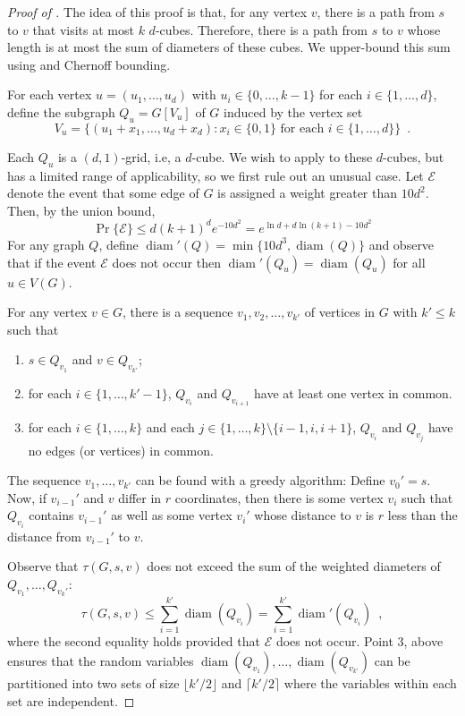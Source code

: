 \documentclass{patmorin}
\DeclareMathOperator{\diam}{diam}
\begin{document}
\begin{proof}[Proof of ]
The idea of this proof is that, for any vertex $v$, there is a path
from $s$ to $v$ that visits at most $k$ $d$-cubes. Therefore, there is
a path from $s$ to $v$ whose length is at most the sum of diameters
of these cubes.  We upper-bound this sum using 
and Chernoff bounding.

For each vertex $u=(u_1,\ldots,u_d)$ with $u_i\in\{0,\ldots,k-1\}$
for each $i\in\{1,\ldots,d\}$, define the subgraph
$Q_u=G[V_u]$ of $G$ induced by the vertex set
\[
    V_u = \{(u_1+x_1,\ldots,u_d+x_d) :\text{$x_i\in\{0,1\}$ for each $i\in\{1,\ldots,d\}$}\} \enspace .
\]

Each $Q_u$ is a $(d,1)$-grid, i.e, a $d$-cube.  We wish to apply
 to these $d$-cubes, but  has
a limited range of applicability, so we first rule out an unusual case.
Let $\mathcal{E}$ denote the event that some edge of $G$ is assigned a
weight greater than $10d^2$.  Then, by the union bound,
\[
    \Pr\{\mathcal{E}\} \le d(k+1)^de^{-10d^2} = e^{\ln d + d\ln(k+1) - 10d^2}
\]
For any graph $Q$, define $\diam'(Q) = \min\{10d^3, \diam(Q)\}$
and observe that if the event $\mathcal{E}$ does not occur then
$\diam'(Q_u)=\diam(Q_u)$ for all $u\in V(G)$.

For any vertex $v\in G$, there is a sequence $v_1,v_2,\ldots,v_{k'}$
of vertices in $G$ with $k'\le k$ such that
\begin{enumerate}
  \item $s\in Q_{v_1}$ and $v\in Q_{v_{k'}}$; 
  \item for each $i\in\{1,\ldots,k'-1\}$, $Q_{v_{i}}$ and $Q_{v_{i+1}}$ have at least one
vertex in common.
  \item for each $i\in\{1,\ldots,k\}$ and each $j\in\{1,\ldots,k\}\setminus\{i-1,i,i+1\}$, $Q_{v_i}$ and $Q_{v_j}$ have no edges (or vertices) in common.
\end{enumerate}
The sequence $v_1,\ldots,v_{k'}$ can be found with a greedy algorithm:
Define $v_0'=s$.  Now, if $v_{i-1}'$ and $v$ differ in $r$ coordinates,
then there is some vertex $v_i$ such that $Q_{v_i}$ contains $v_{i-1}'$
as well as some vertex $v_i'$ whose distance to $v$ is $r$ less than
the distance from $v_{i-1}'$ to $v$.

Observe that $\tau(G,s,v)$ does not exceed the sum of the weighted diameters of
$Q_{v_1},\ldots,Q_{v_k'}$:
\[
   \tau(G,s,v) \le \sum_{i=1}^{k'} \diam(Q_{v_i}) 
               = \sum_{i=1}^{k'} \diam'(Q_{v_i}) \enspace ,
\]
where the second equality holds provided that $\mathcal{E}$ does not occur.
Point 3, above ensures that the random variables
$\diam(Q_{v_1}),\ldots,\diam(Q_{v_{k'}})$ can be partitioned into two
sets of size $\lfloor k'/2\rfloor$ and $\lceil k'/2\rceil$
where the variables within each set are independent.


\end{proof}
\end{document}
